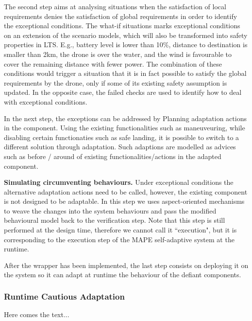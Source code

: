 The second step aims at analysing situations when the satisfaction of local requirements denies the satisfaction of global requirements in order to identify the exceptional conditions. The what-if situations marks exceptional conditions on an extension of the scenario models, which will also be transformed into safety properties in LTS.  E.g., battery level is lower than 10\%, distance to destination is smaller than 2km, the drone is over the water, and the wind is favourable to cover the remaining distance with fewer power. The combination of these conditions would trigger a situation that it is in fact possible to satisfy the global requirements by the drone, only if some of its existing safety assumption is updated. In the opposite case, the failed checks are used to identify how to deal with exceptional conditions. %

In the next step, the exceptions can be addressed by Planning adaptation actions in the component. Using the existing functionalities such as maneuveuring, while disabling certain functionaties such as safe landing, it is possible to switch to a different solution through adaptation. Such adaptions are modelled as advices such as before / around of existing functionalities/actions in the adapted component.

\item {\bf Simulating circumventing behaviours.} Under exceptional conditions the alternative adaptation actions need to be called, however, the existing component is not designed to be adaptable. In this step we uses aspect-oriented mechanisms to weave the changes into the system behaviours and pass the modified behavioural model back to the verification step. Note that this step is still performed at the design time, therefore we cannot call it ``execution", but it is corresponding to the execution step of the MAPE self-adaptive system at the runtime.

After the wrapper has been implemented, the last step consists on deploying it on the system so it can adapt at runtime the behaviour of the defiant components.

\subsubsection{Runtime Cautious Adaptation}

Here comes the text... 